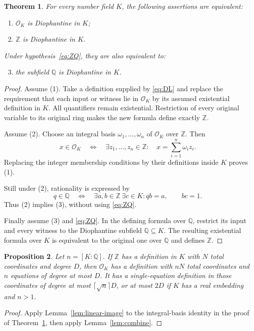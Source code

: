 \documentclass[11pt,a4paper]{article}
\newtheorem{theorem}{Theorem}[section]
\newtheorem{proposition}[theorem]{Proposition}
\theoremstyle{definition}
\newcommand{\Q}{\mathbb Q}
\newcommand{\Z}{\mathbb Z}
\newcommand{\OK}{\mathcal O_K}
\begin{document}
\begin{theorem}\label{thm:equivalence}
For every number field $K$, the following assertions are equivalent:
\begin{enumerate}
\item $\OK$ is Diophantine in $K$;
\item $\Z$ is Diophantine in $K$.
\end{enumerate}
Under hypothesis~\eqref{eq:ZQ}, they are also equivalent to:
\begin{enumerate}\setcounter{enumi}{2}
\item the subfield $\Q$ is Diophantine in $K$.
\end{enumerate}
\end{theorem}
\begin{proof}
Assume (1). Take a definition supplied by \eqref{eq:DL} and replace
the requirement that each input or witness lie in $\OK$ by its
assumed existential definition in $K$. All quantifiers remain
existential. Restriction of every original variable to its original
ring makes the new formula define exactly $\Z$.

Assume (2). Choose an integral basis
$\omega_1,\ldots,\omega_n$ of $\OK$ over $\Z$. Then
\[
 x\in\OK\quad\Longleftrightarrow\quad
 \exists z_1,\ldots,z_n\in\Z:\quad
                    x=\sum_{i=1}^n\omega_i z_i.
\]
Replacing the integer membership conditions by their definitions
inside $K$ proves (1).

Still under (2), rationality is expressed by
\[
 q\in\Q\quad\Longleftrightarrow\quad
 \exists a,b\in\Z\ \exists c\in K:
                         qb=a,\qquad bc=1.
\]
Thus (2) implies (3), without using \eqref{eq:ZQ}.

Finally assume (3) and \eqref{eq:ZQ}. In the defining formula over
$\Q$, restrict its input and every witness to the Diophantine
subfield $\Q\subseteq K$. The resulting existential formula over
$K$ is equivalent to the original one over $\Q$ and defines $\Z$.
\end{proof}

\begin{proposition}\label{prop:integral-count}
Let $n=[K:\Q]$. If $\Z$ has a definition in $K$ with $N$ total
coordinates and degree $D$, then $\OK$ has a definition with
$nN$ total coordinates and $n$ equations of degree at most $D$.
It has a single-equation definition in those coordinates of degree
at most $\lceil\sqrt n\rceil D$, or at most $2D$ if $K$ has a
real embedding and $n>1$.
\end{proposition}
\begin{proof}
Apply Lemma~\ref{lem:linear-image} to the integral-basis identity
in the proof of Theorem~\ref{thm:equivalence}, then apply
Lemma~\ref{lem:combine}.
\end{proof}
\end{document}
